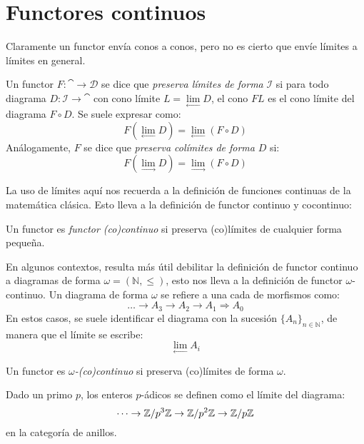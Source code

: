\section{Functores continuos}
Claramente un functor envía conos a conos, pero no es cierto que envíe límites a límites en general.

\begin{definition}
Un functor $F \colon \cat \to \mathcal{D}$ se dice que \emph{preserva límites de forma} $\mathcal{I}$ si para todo diagrama $D \colon \mathcal{I} \to \cat$ con cono límite $L = \underset{\longleftarrow}\lim D$, el cono $F L$ es el cono límite del diagrama $F \circ D$.
Se suele expresar como:
\[ F\left(\underset{\longleftarrow}\lim D\right) = \underset{\longleftarrow}\lim \left(F \circ D\right)\]
Análogamente, $F$ se dice que \emph{preserva colímites de forma} $D$ si:
\[ F\left(\underset{\longrightarrow}\lim D\right) = \underset{\longrightarrow}\lim \left(F \circ D\right)\]
\end{definition}

La uso de límites aquí nos recuerda a la definición de funciones continuas de la matemática clásica.
Esto lleva a la definición de functor continuo y cocontinuo:
\begin{definition}
Un functor es \emph{functor (co)continuo} si preserva (co)límites de cualquier forma pequeña.
\end{definition}

En algunos contextos, resulta más útil debilitar la definición de functor continuo a diagramas de forma $\omega = (\mathbb{N}, \leq)$, esto nos lleva a la definición de functor $\omega$-continuo.
Un diagrama de forma $\omega$ se refiere a una cada de morfismos como:
\[ \dots \rightarrow A_3 \rightarrow A_2 \rightarrow A_1 \Rightarrow A_0 \]
En estos casos, se suele identificar el diagrama con la sucesión $\{A_n\}_{n \in \mathbb{N}}$, de manera que el límite se escribe:
\[ \underset{\longleftarrow}\lim A_i\]
\begin{definition}
Un functor es $\omega$\emph{-(co)continuo} si preserva (co)límites de forma $\omega$.
\end{definition}
\begin{example}
Dado un primo $p$, los enteros $p$-ádicos se definen como el límite del diagrama:
\[ \dots \rightarrow \mathbb{Z}/p^3{\mathbb{Z}} \rightarrow \mathbb{Z}/p^2{\mathbb{Z}} \rightarrow \mathbb{Z}/p{\mathbb{Z}} \]
en la categoría de anillos.
\end{example}

